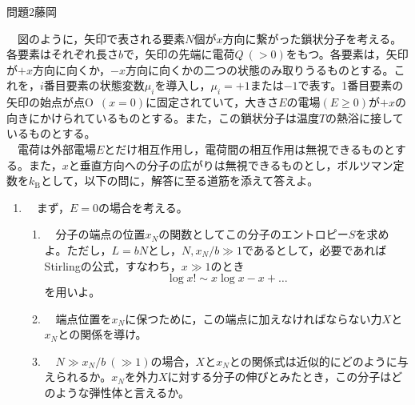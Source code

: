 \documentclass[fleqn]{jbook}
\def\B{\mathrm B}
\begin{document}

\begin{question}{問題2}{藤岡}
\setcounter{equation}{0}

　図のように，矢印で表される要素$N$個が$x$方向に繋がった鎖状分子を考える。各要素はそれぞれ長さ$b$で，矢印の先端に電荷$Q~(>0)$をもつ。各要素は，矢印が$+x$方向に向くか，$-x$方向に向くかの二つの状態のみ取りうるものとする。これを，$i$番目要素の状態変数$\mu_i$を導入し，$\mu_i=+1$または$-1$で表す。1番目要素の矢印の始点が点O~$(x=0)$に固定されていて，大きさ$E$の電場$(E\geq 0)$が$+x$の向きにかけられているものとする。また，この鎖状分子は温度$T$の熱浴に接しているものとする。\\
　電荷は外部電場$E$とだけ相互作用し，電荷間の相互作用は無視できるものとする。また，$x$と垂直方向への分子の広がりは無視できるものとし，ボルツマン定数を$k_\B$として，以下の問に，解答に至る道筋を添えて答えよ。

\begin{figure}[hbt]
\begin{center}
\vspace{0.5cm}

\vfill
\end{center}
\end{figure}

\begin{enumerate}
    \item 　まず，$E=0$の場合を考える。\\

    \begin{enumerate}
        \item 　分子の端点の位置$x_N$の関数としてこの分子のエントロピー$S$を求めよ。ただし，$L=bN$とし，$N,x_N/b\gg 1$であるとして，必要であればStirlingの公式，すなわち，$x\gg 1$のとき
        $$
        \log x!\sim x\log x-x+\dots
        $$
        を用いよ。\\
        
        \item 　端点位置を$x_N$に保つために，この端点に加えなければならない力$X$と$x_N$との関係を導け。\\
        
        \item 　$N\gg x_N/b~(\gg 1)$の場合，$X$と$x_N$との関係式は近似的にどのように与えられるか。$x_N$を外力$X$に対する分子の伸びとみたとき，この分子はどのような弾性体と言えるか。\\
\end{enumerate}


\end{enumerate}
\end{question}
\end{document}
